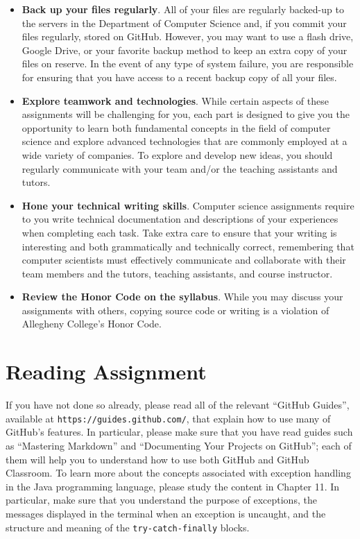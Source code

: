 \documentclass[11pt]{article}
\newcommand{\url}[1]{\lstinline{#1}}
\begin{document}
\begin{itemize}
\item {\bf Back up your files regularly}. All of your files are regularly backed-up to the servers in the Department of
  Computer Science and, if you commit your files regularly, stored on GitHub. However, you may want to use a flash
  drive, Google Drive, or your favorite backup method to keep an extra copy of your files on reserve. In the event of
  any type of system failure, you are responsible for ensuring that you have access to a recent backup copy of all your
  files.

\item {\bf Explore teamwork and technologies}. While certain aspects of these assignments will be challenging for you,
  each part is designed to give you the opportunity to learn both fundamental concepts in the field of computer science
  and explore advanced technologies that are commonly employed at a wide variety of companies. To explore and develop
  new ideas, you should regularly communicate with your team and/or the teaching assistants and tutors.

\item {\bf Hone your technical writing skills}. Computer science assignments require to you write technical
  documentation and descriptions of your experiences when completing each task. Take extra care to ensure that your
  writing is interesting and both grammatically and technically correct, remembering that computer scientists must
  effectively communicate and collaborate with their team members and the tutors, teaching assistants, and course
  instructor.

\item {\bf Review the Honor Code on the syllabus}. While you may discuss your assignments with others, copying source
  code or writing is a violation of Allegheny College's Honor Code.

\end{itemize}

\section*{Reading Assignment}

If you have not done so already, please read all of the relevant ``GitHub Guides'', available at
\url{https://guides.github.com/}, that explain how to use many of GitHub's features. In particular, please make sure
that you have read guides such as ``Mastering Markdown'' and ``Documenting Your Projects on GitHub''; each of them will
help you to understand how to use both GitHub and GitHub Classroom. To learn more about the concepts associated with
exception handling in the Java programming language, please study the content in Chapter 11. In particular, make sure
that you understand the purpose of exceptions, the messages displayed in the terminal when an exception is uncaught, and
the structure and meaning of the {\tt try-catch-finally} blocks.
\end{document}
